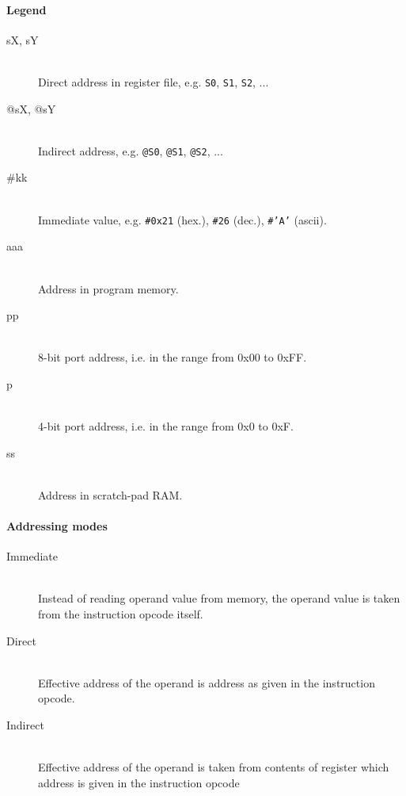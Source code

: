 \newcommand{\instruction}[1]{~\\[7pt]\addcontentsline{toc}{subsection}{#1}\colorbox{instruction_bg}{\parbox{\dimexpr\textwidth-2\fboxsep}{\color{black}\textbf{#1}}}\bigskip}

\paragraph{Legend}
    \begin{description}
        \item[sX, sY]~\\
            Direct address in register file, e.g. \texttt{S0}, \texttt{S1}, \texttt{S2}, ...
        \item[@sX, @sY]~\\
            Indirect address, e.g. \texttt{@S0}, \texttt{@S1}, \texttt{@S2}, ...
        \item[\#kk]~\\
            Immediate value, e.g. \texttt{\#0x21} (hex.), \texttt{\#26} (dec.), \texttt{\#'A'} (ascii).
        \item[aaa]~\\
            Address in program memory.
        \item[pp]~\\
            8-bit port address, i.e. in the range from 0x00 to 0xFF.
        \item[p]~\\
            4-bit port address, i.e. in the range from 0x0 to 0xF.
        \item[ss]~\\
            Address in scratch-pad RAM.
    \end{description}

\paragraph{Addressing modes}
    \begin{description}
        \item[Immediate]~\\
            Instead of reading operand value from memory, the operand value is taken from the instruction opcode itself.
        \item[Direct]~\\
            Effective address of the operand is address as given in the instruction opcode.
        \item[Indirect]~\\
            Effective address of the operand is taken from contents of register which address is given in the instruction opcode
    \end{description}

